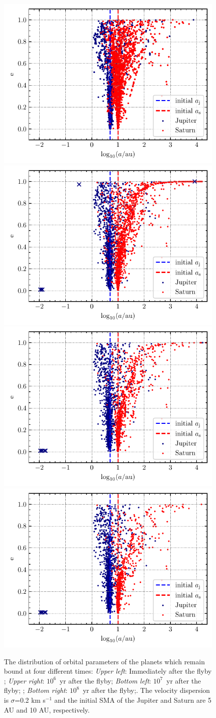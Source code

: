 \documentclass[twocolumn]{aastex63}
\begin{document}
\begin{figure}
    \includegraphics[width=.45\textwidth]{figs/ae-flyby_inone-s02.pdf}
    \includegraphics[width=.45\textwidth]{figs/ae-1e6_inone-s02.pdf}\\
    \includegraphics[width=.45\textwidth]{figs/ae-1e7_inone-s02.pdf}
    \includegraphics[width=.45\textwidth]{figs/ae-1e8_inone-s02.pdf}
    \caption{The distribution of orbital parameters of the planets which remain bound at four different times:
    \textit{Upper left}: Immediately after the flyby ; \textit{Upper right}: $10^6$~yr after the flyby; \textit{Bottom left}: $10^7$~yr after the flyby; ; \textit{Bottom right}: $10^8$~yr after the flyby;. The velocity dispersion is $\sigma$=0.2 km s$^{-1}$ and the initial SMA of the Jupiter and Saturn are 5 AU and 10 AU, respectively.}
    \label{Fig:a-etot-s02}
\end{figure}
\end{document}
